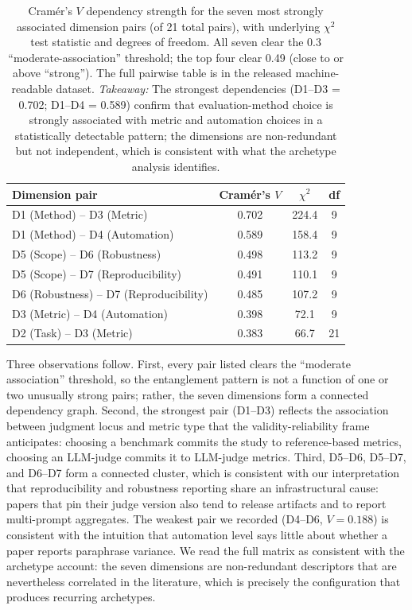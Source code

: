 \documentclass[acmsmall, nonacm, screen]{acmart}
\begin{document}
\begin{table}[!htbp]
\renewcommand{\arraystretch}{1.15}
\caption{Cram\'er's $V$ dependency strength for the seven most
strongly associated dimension pairs (of 21 total pairs), with
underlying $\chi^2$ test statistic and degrees of freedom. All seven
clear the 0.3 ``moderate-association'' threshold; the top four clear
0.49 (close to or above ``strong''). The full pairwise table is in
the released machine-readable dataset.
\textit{Takeaway:} The strongest dependencies (D1--D3 = 0.702;
D1--D4 = 0.589) confirm that evaluation-method choice is strongly
associated with metric and automation choices in a statistically
detectable pattern; the dimensions are non-redundant but not
independent, which is consistent with what the archetype analysis identifies.}
\label{tab:cramerv}
\centering
\footnotesize
\begin{tabular}{l c c c}
\toprule
\textbf{Dimension pair} & \textbf{Cram\'er's $V$} & \textbf{$\chi^2$} & \textbf{df} \\
\midrule
D1 (Method) -- D3 (Metric)        & 0.702 & 224.4 &  9 \\
D1 (Method) -- D4 (Automation)    & 0.589 & 158.4 &  9 \\
D5 (Scope) -- D6 (Robustness)     & 0.498 & 113.2 &  9 \\
D5 (Scope) -- D7 (Reproducibility) & 0.491 & 110.1 &  9 \\
D6 (Robustness) -- D7 (Reproducibility) & 0.485 & 107.2 &  9 \\
D3 (Metric) -- D4 (Automation)    & 0.398 &  72.1 &  9 \\
D2 (Task) -- D3 (Metric)          & 0.383 &  66.7 & 21 \\
\bottomrule
\end{tabular}
\end{table}

Three observations follow. First, every pair listed clears the
``moderate association'' threshold, so the entanglement pattern is
not a function of one or two unusually strong pairs; rather, the
seven dimensions form a connected dependency graph. Second, the
strongest pair (D1--D3) reflects the association between judgment
locus and metric type that the validity-reliability frame anticipates:
choosing a benchmark commits the study to reference-based metrics,
choosing an LLM-judge commits it to LLM-judge metrics. Third, D5--D6, D5--D7, and
D6--D7 form a connected cluster, which is consistent with our
interpretation that reproducibility and robustness reporting share an
infrastructural cause: papers that pin their judge version also tend
to release artifacts and to report multi-prompt aggregates. The
weakest pair we recorded (D4--D6, $V = 0.188$) is consistent with the
intuition that automation level says little about whether a paper
reports paraphrase variance. We read the full matrix as consistent
with the archetype account: the seven dimensions are non-redundant
descriptors that are nevertheless correlated in the literature, which
is precisely the configuration that produces recurring archetypes.
\end{document}
